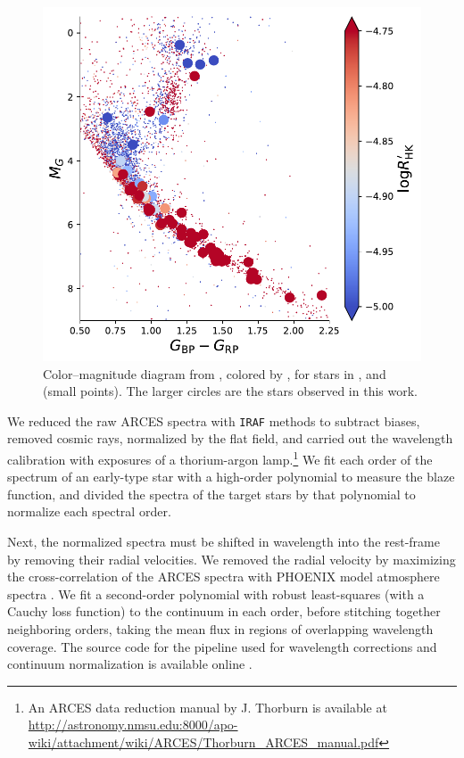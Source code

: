 \begin{figure}
    \centering
    \includegraphics[scale=0.6]{freckles/ms.pdf}
    \caption{Color--magnitude diagram from \citet{GaiaDR2}, colored by \logrprime, for stars in \citet{Duncan1991}, \citet{Wright2004} and \citet{Isaacson2010} (small points). The larger circles are the stars observed in this work.}
    \label{fig:cmd}
\end{figure}

We reduced the raw ARCES spectra with \texttt{IRAF} methods to subtract biases, removed cosmic rays, normalized by the flat field, and carried out the wavelength calibration with exposures of a thorium-argon lamp.\footnote{An ARCES data reduction manual by J. Thorburn is available at \url{http://astronomy.nmsu.edu:8000/apo-wiki/attachment/wiki/ARCES/Thorburn_ARCES_manual.pdf}}
We fit each order of the spectrum of an early-type star with a high-order polynomial to measure the blaze function, and divided the spectra of the target stars by that polynomial to normalize each spectral order.

Next, the normalized spectra must be shifted in wavelength into the rest-frame by removing their radial velocities. We removed the radial velocity by maximizing the cross-correlation of the ARCES spectra with PHOENIX model atmosphere spectra \citep{Husser2013}. We fit a second-order polynomial with robust least-squares (with a Cauchy loss function) to the continuum in each order, before stitching together neighboring orders, taking the mean flux in regions of overlapping wavelength coverage. The source code for the pipeline used for wavelength corrections and continuum normalization is available online \citep{aesop}.

